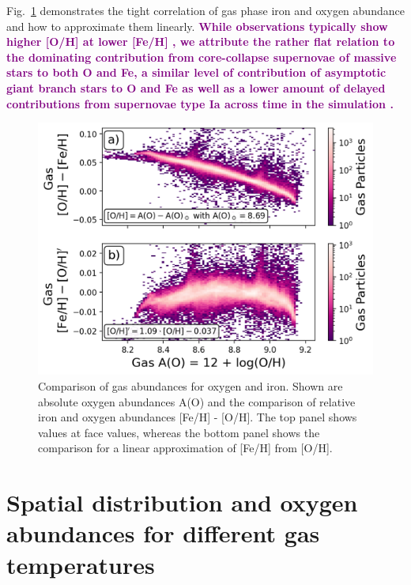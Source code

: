 \documentclass[twocolumn,apj,numberedappendix,appendixfloats,twocolappendix]{openjournal}
\newcommand{\adjusted}[1]{\textbf{\textcolor{purple}{#1}}}
\begin{document}
Fig.~\ref{fig:fe_h_vs_a_o_gas} demonstrates the tight correlation of gas phase iron and oxygen abundance and how to approximate them linearly. \adjusted{While observations typically show higher [O/H] at lower [Fe/H] \citep[e.g.][]{Buder2024b}, we attribute the rather flat relation to the dominating contribution from core-collapse supernovae of massive stars to both O and Fe, a similar level of contribution of asymptotic giant branch stars to O and Fe as well as a lower amount of delayed contributions from supernovae type Ia across time in the simulation \citep[see also][]{Buck2021}.}

\begin{figure}[!ht]
    \centering
    \includegraphics[width=0.9\columnwidth]{figures/fe_h_vs_a_o_gas}
    \caption{Comparison of gas abundances for oxygen and iron. Shown are absolute oxygen abundances A(O) and the comparison of relative iron and oxygen abundances [Fe/H] - [O/H]. The top panel shows values at face values, whereas the bottom panel shows the comparison for a linear approximation of [Fe/H] from [O/H].}    \label{fig:fe_h_vs_a_o_gas}
\end{figure}

\section{Spatial distribution and oxygen abundances for different gas temperatures} \label{sec:app_b}
\end{document}
